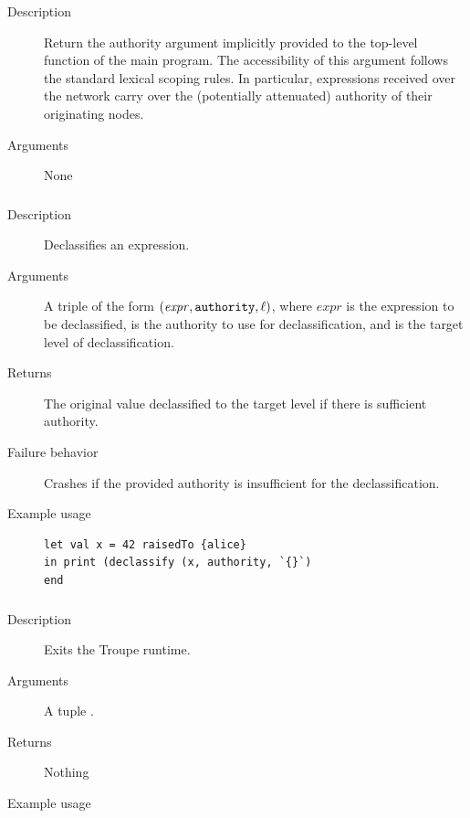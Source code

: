 \begin{description}
    \item [Description] Return the authority argument implicitly provided to the top-level function of the main program.
The accessibility of this argument follows the standard lexical scoping rules. In particular, expressions received over the network carry over the (potentially attenuated) authority of their originating nodes.
    \item [Arguments] None
\end{description}


\subsubsection{}
\begin{description}
    \item [Description] Declassifies an expression.
    \item [Arguments] A triple of the form $(\mathit{expr}, {\mathtt{authority}}, {\mathtt{\ell}} )$, where $\mathit{expr}$ is the expression to be declassified,  is the authority to use for declassification, and \code{\ell} is the target level of declassification.
    \item [Returns] The original value declassified to the target level if there is sufficient authority.
    \item [Failure behavior] Crashes if the provided authority is insufficient for the declassification.
    \item [Example usage]
\begin{minipage}[t]{30em}
\begin{verbatim}
let val x = 42 raisedTo {alice}
in print (declassify (x, authority, `{}`)
end
\end{verbatim}
\end{minipage}
\end{description}


\subsubsection{}
\begin{description}
    \item [Description] Exits the Troupe runtime.
    \item [Arguments] A tuple .
    \item [Returns] Nothing
    \item [Example usage] 
\end{description}


